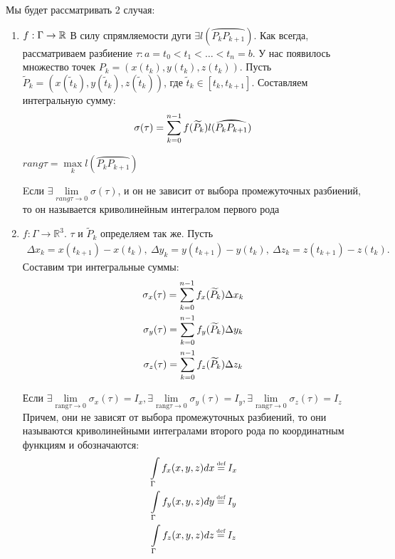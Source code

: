 Мы будет рассматривать 2 случая:
\begin{enumerate}
	\item
		$f: \Gamma \rightarrow \mathbb{R}\\$ 
		В силу спрямляемости дуги $\exists l(\wideparen{P_k P_{k + 1}})$.
		Как всегда, рассматриваем разбиение $\tau: a = t_0 < t_1 < \dots < t_n = b$. 
		У нас появилось множество точек $P_k = (x(t_k), y(t_k), z(t_k))$.
		Пусть $\widetilde{P}_k = (x(\widetilde{t}_k), y(\widetilde{t}_k), z(\widetilde{t}_k))$, 
		где $\widetilde{t}_k \in [t_k, t_{k + 1}]$.
		Составляем интегральную сумму:
		\begin{gather}
			\sigma(\tau) = \sumlr{k = 0}{n - 1} f(\widetilde{P}_k)l(\wideparen{P_k P_{k + 1}})
		\end{gather}
		\begin{definition}
			$rang\tau = \max\limits_{k} l(\wideparen{P_k P_{k + 1}})$
		\end{definition}
		\begin{definition}
			Eсли $\exists \lim\limits_{rang\tau \rightarrow 0} \sigma(\tau)$, и он не зависит от 
			выбора промежуточных разбиений, то он называется криволинейным интегралом первого рода
		\end{definition}
	\item
		$f: \Gamma \rightarrow \mathbb{R}^3$.
		$\tau$ и $\widetilde{P}_k$ определяем так же.
		Пусть
		\begin{gather*}
		\Delta x_k = x(t_{k + 1}) - x(t_k),\:
		\Delta y_k = y(t_{k + 1}) - y(t_k),\:
		\Delta z_k = z(t_{k + 1}) - z(t_k).
		\end{gather*}
		Составим три интегральные суммы:
		\begin{gather}
			\sigma_x(\tau) = \sum\limits_{k = 0}^{n - 1}f_x(\widetilde{P}_k)\Delta x_k \\
			\sigma_y(\tau) = \sum\limits_{k = 0}^{n - 1}f_y(\widetilde{P}_k)\Delta y_k \\
			\sigma_z(\tau) = \sum\limits_{k = 0}^{n - 1}f_z(\widetilde{P}_k)\Delta z_k
		\end{gather}
		\begin{definition}
			Если $\exists \lim\limits_{\text{rang}\tau \rightarrow 0}\sigma_x(\tau) = I_x, 
			\exists \lim\limits_{\text{rang}\tau \rightarrow 0}\sigma_y(\tau) = I_y,
			\exists \lim\limits_{\text{rang}\tau \rightarrow 0}\sigma_z(\tau) = I_z$
			Причем, они не зависят от выбора промежуточных разбиений, 
			то они называются криволинейными интегралами второго рода по координатным функциям
			и обозначаются:
			\begin{gather*}
				\intl{\Gamma}f_x(x, y, z)dx \defeq I_x \\
				\intl{\Gamma}f_y(x, y, z)dy \defeq I_y \\
				\intl{\Gamma}f_z(x, y, z)dz \defeq I_z 
			\end{gather*}
		\end{definition}
\end{enumerate}

